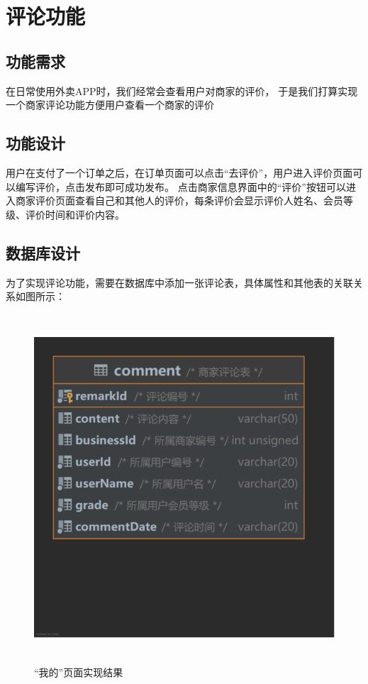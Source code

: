 \section{评论功能}
\subsection{功能需求}
在日常使用外卖APP时，我们经常会查看用户对商家的评价，
于是我们打算实现一个商家评论功能方便用户查看一个商家的评价~\\

\subsection{功能设计}
用户在支付了一个订单之后，在订单页面可以点击“去评价”，用户进入评价页面可以编写评价，点击发布即可成功发布。
点击商家信息界面中的“评价”按钮可以进入商家评价页面查看自己和其他人的评价，每条评价会显示评价人姓名、会员等级、评价时间和评价内容。~\\

\subsection{数据库设计}
为了实现评论功能，需要在数据库中添加一张评论表，具体属性和其他表的关联关系如图所示：

\begin{figure}[H]
    \centering
    \includegraphics[width=13cm,height=13cm]{figures/table4.png}
    \caption{“我的”页面实现结果}
\end{figure}

